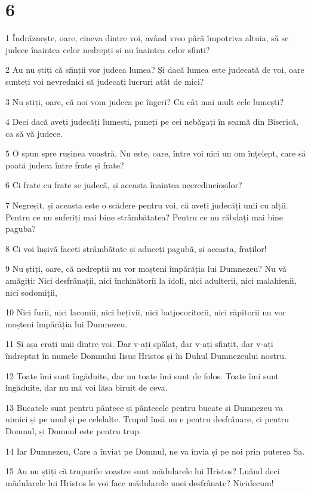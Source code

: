 \chapter{6}

\par 1 Îndrăznește, oare, cineva dintre voi, având vreo pâră împotriva altuia, să se judece înaintea celor nedrepți și nu înaintea celor sfinți?
\par 2 Au nu știți că sfinții vor judeca lumea? Și dacă lumea este judecată de voi, oare sunteți voi nevrednici să judecați lucruri atât de mici?
\par 3 Nu știți, oare, că noi vom judeca pe îngeri? Cu cât mai mult cele lumești?
\par 4 Deci dacă aveți judecăți lumești, puneți pe cei nebăgați în seamă din Biserică, ca să vă judece.
\par 5 O spun spre rușinea voastră. Nu este, oare, între voi nici un om înțelept, care să poată judeca între frate și frate?
\par 6 Ci frate cu frate se judecă, și aceasta înaintea necredincioșilor?
\par 7 Negreșit, și aceasta este o scădere pentru voi, că aveți judecăți unii cu alții. Pentru ce nu suferiți mai bine strâmbătatea? Pentru ce nu răbdați mai bine paguba?
\par 8 Ci voi înșivă faceți strâmbătate și aduceți pagubă, și aceasta, fraților!
\par 9 Nu știți, oare, că nedrepții nu vor moșteni împărăția lui Dumnezeu? Nu vă amăgiți: Nici desfrânații, nici închinătorii la idoli, nici adulterii, nici malahienii, nici sodomiții,
\par 10 Nici furii, nici lacomii, nici bețivii, nici batjocoritorii, nici răpitorii nu vor moșteni împărăția lui Dumnezeu.
\par 11 Și așa erați unii dintre voi. Dar v-ați spălat, dar v-ați sfințit, dar v-ați îndreptat în numele Domnului Iisus Hristos și în Duhul Dumnezeului nostru.
\par 12 Toate îmi sunt îngăduite, dar nu toate îmi sunt de folos. Toate îmi sunt îngăduite, dar nu mă voi lăsa biruit de ceva.
\par 13 Bucatele sunt pentru pântece și pântecele pentru bucate și Dumnezeu va nimici și pe unul și pe celelalte. Trupul însă nu e pentru desfrânare, ci pentru Domnul, și Domnul este pentru trup.
\par 14 Iar Dumnezeu, Care a înviat pe Domnul, ne va învia și pe noi prin puterea Sa.
\par 15 Au nu știți că trupurile voastre sunt mădularele lui Hristos? Luând deci mădularele lui Hristos le voi face mădularele unei desfrânate? Nicidecum!
